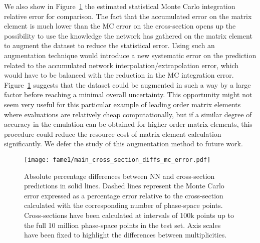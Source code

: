 \documentclass[main.tex]{subfiles}
\begin{document}
We also show in Figure~\ref{fig:cross_section_diffs} the estimated statistical Monte Carlo integration relative error for comparison.
The fact that the accumulated error on the matrix element is much lower than the MC error on the cross-section opens up the possibility 
to use the knowledge the network has gathered on the matrix element to augment the dataset to reduce the statistical error. Using such an 
augmentation technique would introduce a new systematic error on the prediction related to the accumulated network interpolation/extrapolation error, 
which would have to be balanced with the reduction in the MC integration error. Figure~\ref{fig:cross_section_diffs} suggests that the dataset could be 
augmented in such a way by a large factor before reaching a minimal overall uncertainty. This opportunity might not seem very useful for this particular example of leading 
order matrix elements where evaluations are relatively cheap computationally, but 
if a similar degree of accuracy in the emulation can be obtained for higher order matrix elements, this procedure could reduce the resource cost of matrix element calculation
significantly. We defer the study of this augmentation method to future work.

\begin{figure}
    \centering
    \texttt{[image: fame1/main\_cross\_section\_diffs\_mc\_error.pdf]}
    \caption{Absolute percentage differences between NN and {\NJet} cross-section predictions in solid lines.
    Dashed lines represent the Monte Carlo error expressed as a percentage error relative to the {\NJet} cross-section calculated with the corresponding number of phase-space points.
    Cross-sections have been calculated at intervals of 100k points up to the full 10 million phase-space points in the test set.
    Axis scales have been fixed to highlight the differences between multiplicities.}
    \label{fig:cross_section_diffs}
\end{figure}
\end{document}
